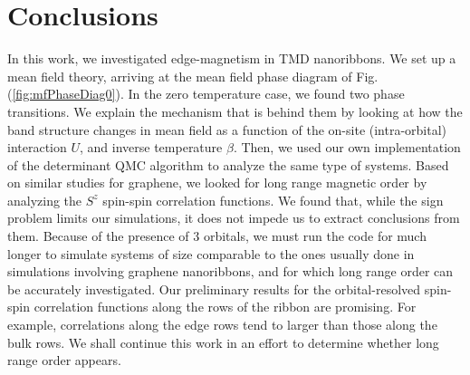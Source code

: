 
\section{Conclusions}
\label{sec:concl}

In this work, we investigated edge-magnetism in TMD nanoribbons.
We set up a mean field theory, arriving at the mean field phase diagram of Fig.(\ref{fig:mfPhaseDiag0}).
In the zero temperature case, we found two phase transitions.
We explain the mechanism that is behind them by looking at how the band structure changes in mean field as a function of the on-site (intra-orbital) interaction $U$, and inverse temperature $\beta$.
Then, we used our own implementation of the determinant QMC algorithm to analyze the same type of systems.
Based on similar studies for graphene, we looked for long range magnetic order by analyzing the $S^z$ spin-spin correlation functions.
We found that, while the sign problem limits our simulations, it does not impede us to extract conclusions from them.
Because of the presence of 3 orbitals, we must run the code for much longer to simulate systems of size comparable to the ones usually done in simulations involving graphene nanoribbons, and for which long range order can be accurately investigated.
Our preliminary results for the orbital-resolved spin-spin correlation functions along the rows of the ribbon are promising. For example, correlations along the edge rows tend to larger than those along the bulk rows.
We shall continue this work in an effort to determine whether long range order appears.
